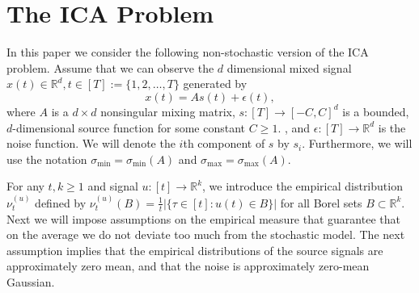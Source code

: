 \documentclass[twoside,11pt]{article}
\newcommand{\real}{\mathbb{R}}
\newcommand{\R}{\real}
\begin{document}
\section{The ICA Problem}
\label{sec:Preliminaries}
In this paper we consider the following non-stochastic version of the ICA problem.
Assume that we can observe the $d$ dimensional mixed signal $x(t) \in \R^d, t \in [T]:=\{1,2,\ldots,T\}$ generated by  
\begin{equation}
\label{eq:ICA}
x(t) = As(t)+\epsilon(t), 
\end{equation}
where $A$ is a $d\times d$ nonsingular mixing matrix,  $s:[T] \to [-C,C]^d$ is a bounded, $d$-dimensional source function for some constant $C \ge 1$. , and $\epsilon:[T] \to \R^d$ is the noise function. We will denote the $i$th component of $s$ by $s_i$. Furthermore, we will use the notation $\sigma_{\min}=\sigma_{\min}(A)$ and
$\sigma_{\max}=\sigma_{\max}(A)$.

For any $t,k \ge 1$ and signal $u:[t] \to \R^k$, we introduce the empirical distribution $\nu_t^{(u)}$ defined by
$\nu_t^{(u)}(B)=\tfrac{1}{t}|\{\tau \in [t]: u(t) \in B\}|$ for all Borel sets $B \subset \R^k$. Next we will impose assumptions on the empirical measure that guarantee that on the average we do not deviate too much from the stochastic model. The next assumption implies that the empirical distributions of the source signals are approximately zero mean, and that the noise is approximately zero-mean Gaussian.
\end{document}
